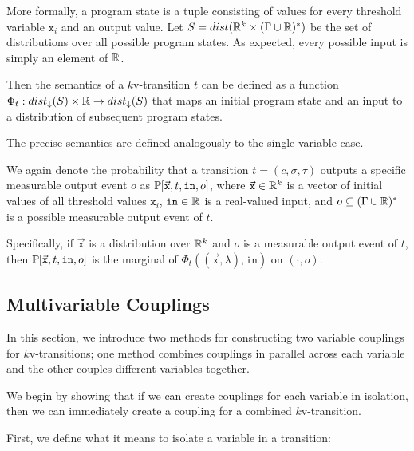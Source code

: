 More formally, a program state is a tuple consisting of values for every threshold variable $\texttt{x}_i$ and an output value. Let $S = dist(\mathbb{R}^k\times (\Gamma\cup \mathbb{R})^*)$ be the set of distributions over all possible program states. As expected, every possible input is simply an element of $\mathbb{R}$. 



Then the semantics of a $k$v-transition $t$ can be defined as a function $\Phi_t: dist_\downarrow(S)\times \mathbb{R}\to dist_\downarrow(S)$ that maps an initial program state and an input to a distribution of subsequent program states.

The precise semantics are defined analogously to the single variable case. 

We again denote the probability that a transition $t=(c, \sigma, \tau)$ outputs a specific measurable output event $o$ as $\mathbb{P}[\vec{\texttt{x}}, t, \texttt{in}, o]$, where $\vec{\texttt{x}}\in \mathbb{R}^k$ is a vector of initial values of all threshold values $\texttt{x}_i$, $\texttt{in}\in \mathbb{R}$ is a real-valued input, and $o\subseteq (\Gamma\cup\mathbb{R})^*$  is a possible measurable output event of $t$.

Specifically, if $\vec{\texttt{x}}$ is a distribution over $\mathbb{R}^k$ and $o$ is a measurable output event of $t$, then $\mathbb{P}[\vec{\texttt{x}}, t, \texttt{in}, o]$ is the marginal of $\Phi_t((\vec{\texttt{x}}, \lambda), \texttt{in})$ on $(\cdot, o)$.

\subsection{Multivariable Couplings}

In this section, we introduce two methods for constructing two variable couplings for $k$v-transitions; one method combines couplings in parallel across each variable and the other couples different variables together. 

We begin by showing that if we can create couplings for each variable in isolation, then we can immediately create a coupling for a combined $k$v-transition. 

First, we define what it means to isolate a variable in a transition: 


